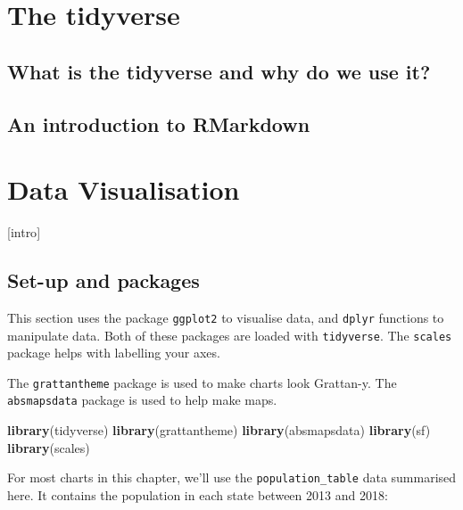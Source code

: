 \documentclass[]{book}
\newenvironment{Shaded}{\begin{snugshade}}{\end{snugshade}}
\newcommand{\KeywordTok}[1]{\textcolor[rgb]{0.13,0.29,0.53}{\textbf{#1}}}
\newcommand{\NormalTok}[1]{#1}
\begin{document}
\hypertarget{the-tidyverse}{%
\chapter{The tidyverse}\label{the-tidyverse}}

\hypertarget{what-is-the-tidyverse-and-why-do-we-use-it}{%
\section{What is the tidyverse and why do we use it?}\label{what-is-the-tidyverse-and-why-do-we-use-it}}

\hypertarget{an-introduction-to-rmarkdown}{%
\section{An introduction to RMarkdown}\label{an-introduction-to-rmarkdown}}

\hypertarget{data-visualisation}{%
\chapter{Data Visualisation}\label{data-visualisation}}

{[}intro{]}

\hypertarget{set-up-and-packages}{%
\section{Set-up and packages}\label{set-up-and-packages}}

This section uses the package \texttt{ggplot2} to visualise data, and \texttt{dplyr} functions to manipulate data. Both of these packages are loaded with \texttt{tidyverse}. The \texttt{scales} package helps with labelling your axes.

The \texttt{grattantheme} package is used to make charts look Grattan-y. The \texttt{absmapsdata} package is used to help make maps.

\begin{Shaded}
\begin{Highlighting}[]
\KeywordTok{library}\NormalTok{(tidyverse)}
\KeywordTok{library}\NormalTok{(grattantheme)}
\KeywordTok{library}\NormalTok{(absmapsdata)}
\KeywordTok{library}\NormalTok{(sf)}
\KeywordTok{library}\NormalTok{(scales)}
\end{Highlighting}
\end{Shaded}

For most charts in this chapter, we'll use the \texttt{population\_table} data summarised here. It contains the population in each state between 2013 and 2018:
\end{document}
